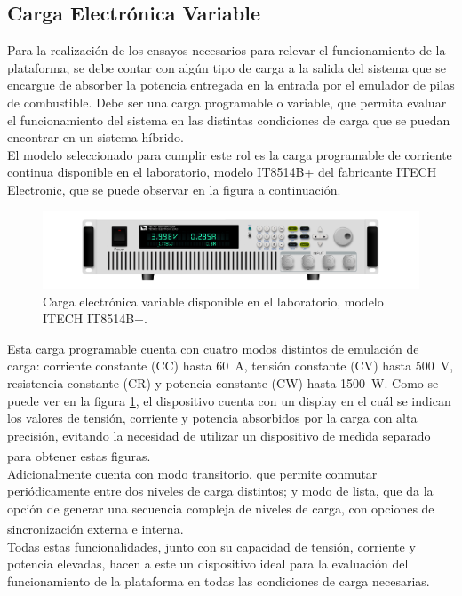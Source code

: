 \subsection{Carga Electrónica Variable}

Para la realización de los ensayos necesarios para relevar el funcionamiento de la plataforma, se debe contar con algún tipo de carga a la salida del sistema que se encargue de absorber la potencia entregada en la entrada por el emulador de pilas de combustible. Debe ser una carga programable o variable, que permita evaluar el funcionamiento del sistema en las distintas condiciones de carga que se puedan encontrar en un sistema híbrido.\\

El modelo seleccionado para cumplir este rol es la carga programable de corriente continua disponible en el laboratorio, modelo {\Medium IT8514B+} del fabricante ITECH Electronic, que se puede observar en la figura a continuación.\\

\begin{figure}[h]
    \centering
    \includegraphics[scale=0.55]{Imagenes/Carga Variable.png}
    \caption{Carga electrónica variable disponible en el laboratorio, modelo ITECH IT8514B+.}
    \label{carga_variable}
\end{figure}

Esta carga programable cuenta con cuatro modos distintos de emulación de carga: corriente constante (CC) hasta \SI[]{60}{\ampere}, tensión constante (CV) hasta \SI[]{500}{\volt}, resistencia constante (CR) y potencia constante (CW) hasta \SI[]{1500}{\watt}. Como se puede ver en la figura \ref{carga_variable}, el dispositivo cuenta con un display en el cuál se indican los valores de tensión, corriente y potencia absorbidos por la carga con alta precisión, evitando la necesidad de utilizar un dispositivo de medida separado para obtener estas figuras.\textsuperscript{\cite{CargaVariable}}\\

Adicionalmente cuenta con modo transitorio, que permite conmutar periódicamente entre dos niveles de carga distintos; y modo de lista, que da la opción de generar una secuencia compleja de niveles de carga, con opciones de sincronización externa e interna.\textsuperscript{\cite{CargaVariable}}\\

Todas estas funcionalidades, junto con su capacidad de tensión, corriente y potencia elevadas, hacen a este un dispositivo ideal para la evaluación del funcionamiento de la plataforma en todas las condiciones de carga necesarias.\\